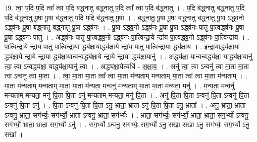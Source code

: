 \documentclass[17pt]{extarticle}
\begin{document}
19. त्वा॒ प॒दि प॒दि त्वा᳚ त्वा प॒दि ब॑द्ध्नातु बद्ध्नातु प॒दि त्वा᳚ त्वा प॒दि ब॑द्ध्नातु । . प॒दि ब॑द्ध्नातु बद्ध्नातु प॒दि प॒दि ब॑द्ध्नातु पू॒षा पू॒षा ब॑द्ध्नातु प॒दि प॒दि ब॑द्ध्नातु पू॒षा । . ब॒द्ध्ना॒तु॒ पू॒षा पू॒षा ब॑द्ध्नातु बद्ध्नातु पू॒षा ऽद्ध्व॒नो ऽद्ध्व॑नः पू॒षा ब॑द्ध्नातु बद्ध्नातु पू॒षा ऽद्ध्व॑नः । . पू॒षा ऽद्ध्व॒नो ऽद्ध्व॑नः पू॒षा पू॒षा ऽद्ध्व॑नः पातु पा॒त्वद्ध्व॑नः पू॒षा पू॒षा ऽद्ध्व॑नः पातु । . अद्ध्व॑नः पातु पा॒त्वद्ध्व॒नो ऽद्ध्व॑नः पा॒त्विन्द्रा॒ये न्द्रा॑य पा॒त्वद्ध्व॒नो ऽद्ध्व॑नः पा॒त्विन्द्रा॑य । . पा॒त्विन्द्रा॒ये न्द्रा॑य पातु पा॒त्विन्द्रा॒या द्ध्य॑क्षा॒याद्ध्य॑क्षा॒ये न्द्रा॑य पातु पा॒त्विन्द्रा॒या द्ध्य॑क्षाय । . इन्द्रा॒याद्ध्य॑क्षा॒या द्ध्य॑क्षा॒ये न्द्रा॒ये न्द्रा॒या द्ध्य॑क्षा॒यान्वन्वद्ध्य॑क्षा॒ये न्द्रा॒ये न्द्रा॒या द्ध्य॑क्षा॒यानु॑ । . अद्ध्य॑क्षा॒ यान्वन्वद्ध्य॑क्षा॒ याद्ध्य॑क्षा॒यानु॑ त्वा॒ त्वा ऽन्वद्ध्य॑क्षा॒ याद्ध्य॑क्षा॒यानु॑ त्वा । . अद्ध्य॑क्षा॒येत्यधि॑ - अ॒क्षा॒य॒ । . अनु॑ त्वा॒ त्वा ऽन्वनु॑ त्वा मा॒ता मा॒ता त्वा ऽन्वनु॑ त्वा मा॒ता । . त्वा॒ मा॒ता मा॒ता त्वा᳚ त्वा मा॒ता म॑न्यताम् मन्यताम् मा॒ता त्वा᳚ त्वा मा॒ता म॑न्यताम् । . मा॒ता म॑न्यताम् मन्यताम् मा॒ता मा॒ता म॑न्यता॒ मन्वनु॑ मन्यताम् मा॒ता मा॒ता म॑न्यता॒ मनु॑ । . म॒न्य॒ता॒ मन्वनु॑ मन्यताम् मन्यता॒ मनु॑ पि॒ता पि॒ता ऽनु॑ मन्यताम् मन्यता॒ मनु॑ पि॒ता । . अनु॑ पि॒ता पि॒ता ऽन्वनु॑ पि॒ता ऽन्वनु॑ पि॒ता ऽन्वनु॑ पि॒ता ऽनु॑ । . पि॒ता ऽन्वनु॑ पि॒ता पि॒ता ऽनु॒ भ्राता॒ भ्राता ऽनु॑ पि॒ता पि॒ता ऽनु॒ भ्राता᳚ । . अनु॒ भ्राता॒ भ्राता ऽन्वनु॒ भ्राता॒ सग॑र्भ्यः॒ सग॑र्भ्यो॒ भ्राता ऽन्वनु॒ भ्राता॒ सग॑र्भ्यः । . भ्राता॒ सग॑र्भ्यः॒ सग॑र्भ्यो॒ भ्राता॒ भ्राता॒ सग॒र्भ्यो ऽन्वनु॒ सग॑र्भ्यो॒ भ्राता॒ भ्राता॒ सग॒र्भ्यो ऽनु॑ । . सग॒र्भ्यो ऽन्वनु॒ सग॑र्भ्यः॒ सग॒र्भ्यो ऽनु॒ सखा॒ सखा ऽनु॒ सग॑र्भ्यः॒ सग॒र्भ्यो ऽनु॒ सखा᳚ । \newline
\end{document}
